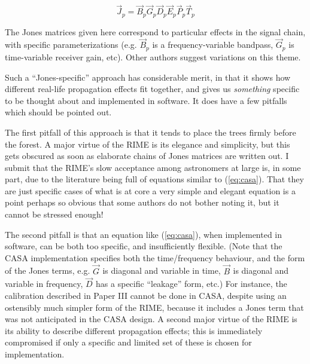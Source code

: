 \documentclass{aa}
\newcommand{\jones}[2]{\vec {#1}_{#2}}
\begin{document}
\begin{equation}\label{eq:casa}
\jones{J}{p} = \jones{B}{p} \jones{G}{p} \jones{D}{p} \jones{E}{p} \jones{P}{p} \vec  T_p
\end{equation}

The Jones matrices given here correspond to particular effects in the signal chain, with specific parameterizations (e.g. $\jones{B}{p}$ is a frequency-variable bandpass, $\jones{G}{p}$ is time-variable receiver gain, etc). Other authors \citep{Rau:DDEs} suggest variations on this theme. 

Such a ``Jones-specific'' approach has considerable merit, in that it shows how different real-life propagation effects fit together, and gives us {\em something} specific to be thought about and implemented in software. It does have a few pitfalls which should be pointed out.

The first pitfall of this approach is that it tends to place the trees firmly before the forest. A major virtue of the RIME is its elegance and simplicity, but this gets obscured as soon as elaborate chains of Jones matrices are written out.  I submit that the RIME's slow acceptance among astronomers at large is, in some part, due to the literature being full of equations similar to (\ref{eq:casa}). That they are just specific cases of what is at core a very simple and elegant equation is a point perhaps so obvious that some authors do not bother noting it, but it cannot be stressed enough!

The second pitfall is that an equation like (\ref{eq:casa}), when implemented in software, can be both too specific, and insufficiently flexible. (Note that the CASA implementation specifies both the time/frequency behaviour, and the form of the Jones terms, e.g. $\jones{G}{}$ is diagonal and variable in time, $\jones{B}{}$ is diagonal and variable in frequency,
$\jones{D}{}$ has a specific ``leakage'' form, etc.) For instance, the calibration described in Paper III \citep{RRIME3} cannot be done in CASA, despite using an ostensibly much simpler form of the RIME, because it includes a Jones term that was not anticipated in the CASA design. A second major virtue of the RIME is its ability to describe different propagation effects; this is immediately compromised if only a specific and limited set of these is chosen for implementation.
\end{document}
